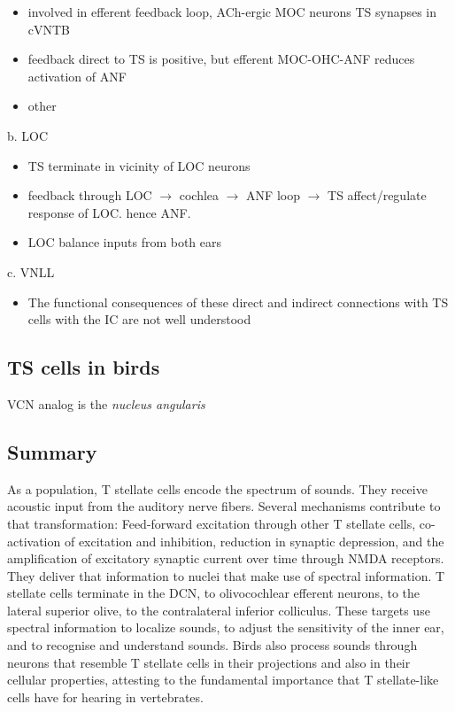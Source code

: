 \begin{itemize}
\item involved in efferent feedback loop, ACh-ergic MOC neurons TS synapses in cVNTB \citep{WarrBeck:1996,Warr:1992,Warr:1982,VeneciaLibermanEtAl:2005,ThompsonThompson:1991,SmithJorisEtAl:1993}
\item feedback direct to TS is positive, but efferent MOC-OHC-ANF reduces activation of ANF \citep{WarrenLiberman:1989,WiederholdKiang:1970}
\item other \citep{RobertsonMulders:2000,WinterRobertsonEtAl:1989}
\end{itemize}
b. LOC

\begin{itemize}
\item TS terminate in vicinity of LOC neurons \citep{Warr:1982,ThompsonThompson:1988,ThompsonThompson:1991,DoucetRyugo:2003}
\item feedback through LOC $\rightarrow$ cochlea $\rightarrow$ ANF loop $\rightarrow$ TS affect/regulate response of LOC. hence ANF.
\item LOC balance inputs from both ears \citep{DarrowMaisonEtAl:2006}
\end{itemize}

c. VNLL

\begin{itemize}
\item The functional consequences of these direct and indirect connections with TS cells with the IC are not well understood
\end{itemize}
\subsection{TS cells in birds}
\label{sec-1_7}


VCN analog is the \emph{nucleus angularis}
\subsection{Summary}
\label{sec-1_8}


As a population, T stellate cells encode the spectrum of sounds. They
receive acoustic input from the auditory nerve fibers. Several
mechanisms contribute to that transformation: Feed-forward excitation
through other T stellate cells, co-activation of excitation and
inhibition, reduction in synaptic depression, and the amplification of
excitatory synaptic current over time through NMDA receptors. They
deliver that information to nuclei that make use of spectral
information.  T stellate cells terminate in the DCN, to olivocochlear
efferent neurons, to the lateral superior olive, to the contralateral
inferior colliculus. These targets use spectral information to
localize sounds, to adjust the sensitivity of the inner ear, and to
recognise and understand sounds. Birds also process sounds through
neurons that resemble T stellate cells in their projections and also
in their cellular properties, attesting to the fundamental importance
that T stellate-like cells have for hearing in vertebrates.










